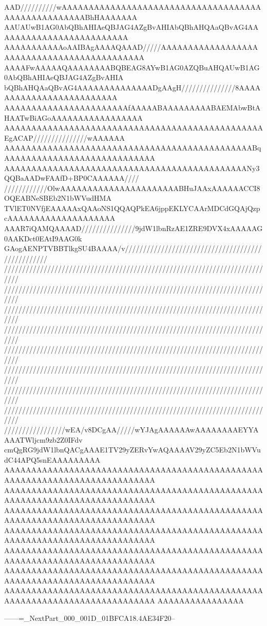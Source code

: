 AAD//////////wAAAAAAAAAAAAAAAAAAAAAAAAAAAAAAAAAAAAAAAAAAAAAAAAAAAABhHAAAAAAA
AAUAUwB1AG0AbQBhAHIAeQBJAG4AZgBvAHIAbQBhAHQAaQBvAG4AAAAAAAAAAAAAAAAAAAAAAAAA
AAAAAAAAAAAoAAIBAgAAAAQAAAD/////AAAAAAAAAAAAAAAAAAAAAAAAAAAAAAAAAAAAAAAAAAAA
AAAAFwAAAAAQAAAAAAAABQBEAG8AYwB1AG0AZQBuAHQAUwB1AG0AbQBhAHIAeQBJAG4AZgBvAHIA
bQBhAHQAaQBvAG4AAAAAAAAAAAAAADgAAgH///////////////8AAAAAAAAAAAAAAAAAAAAAAAAA
AAAAAAAAAAAAAAAAAAAAAAAfAAAAABAAAAAAAAABAEMAbwBtAHAATwBiAGoAAAAAAAAAAAAAAAAA
AAAAAAAAAAAAAAAAAAAAAAAAAAAAAAAAAAAAAAAAAAAAAAAAEgACAP///////////////wAAAAAA
AAAAAAAAAAAAAAAAAAAAAAAAAAAAAAAAAAAAAAAAAAAAAABqAAAAAAAAAAAAAAAAAAAAAAAAAAAA
AAAAAAAAAAAAAAAAAAAAAAAAAAAAAAAAAAAAAAAAAAAAANy3QQBaAADwFAAfD+BP0CAAAAAA////
////////////OlwAAAAAAAAAAAAAAAAAAAAAABHuJAAxAAAAAACCI8OQEABNeSBEb2N1bWVudHMA
TVlET0NVfjEAAAAAxQAAoNS1QQAQPkEA6jppEKLYCAArMDCdGQAjQzpcAAAAAAAAAAAAAAAAAAAA
AAAR7iQAMQAAAAD///////////////9jdW1lbnRzAE1ZRE9DVX4xAAAAAG0AAKDct0EAtI9AAG0k
GAogAENPTVBBTlkgSU4BAAAA/v//////////////////////////////////////////////////
////////////////////////////////////////////////////////////////////////////
////////////////////////////////////////////////////////////////////////////
////////////////////////////////////////////////////////////////////////////
////////////////////////////////////////////////////////////////////////////
////////////////////////////////////////////////////////////////////////////
////////////////////////////////////////////////////////////////////////////
////////////////////////////////////////////////////////////////////////////
////////////////////////////////////////////////////////////////////////////
/////////////////wEA/v8DCgAA/////wYJAgAAAAAAwAAAAAAAAEYYAAAATWljcm9zb2Z0IFdv
cmQgRG9jdW1lbnQACgAAAE1TV29yZERvYwAQAAAAV29yZC5Eb2N1bWVudC44APQ5snEAAAAAAAAA
AAAAAAAAAAAAAAAAAAAAAAAAAAAAAAAAAAAAAAAAAAAAAAAAAAAAAAAAAAAAAAAAAAAAAAAAAAAA
AAAAAAAAAAAAAAAAAAAAAAAAAAAAAAAAAAAAAAAAAAAAAAAAAAAAAAAAAAAAAAAAAAAAAAAAAAAA
AAAAAAAAAAAAAAAAAAAAAAAAAAAAAAAAAAAAAAAAAAAAAAAAAAAAAAAAAAAAAAAAAAAAAAAAAAAA
AAAAAAAAAAAAAAAAAAAAAAAAAAAAAAAAAAAAAAAAAAAAAAAAAAAAAAAAAAAAAAAAAAAAAAAAAAAA
AAAAAAAAAAAAAAAAAAAAAAAAAAAAAAAAAAAAAAAAAAAAAAAAAAAAAAAAAAAAAAAAAAAAAAAAAAAA
AAAAAAAAAAAAAAAAAAAAAAAAAAAAAAAAAAAAAAAAAAAAAAAAAAAAAAAAAAAAAAAAAAAAAAAAAAAA
AAAAAAAAAAAAAAAAAAAAAAAAAAAAAAAAAAAAAAAAAAAAAAAAAAAAAAAAAAAAAAAAAAAAAAAAAAAA
AAAAAAAAAAAAAAAA

------=_NextPart_000_001D_01BFCA18.4AE34F20--

